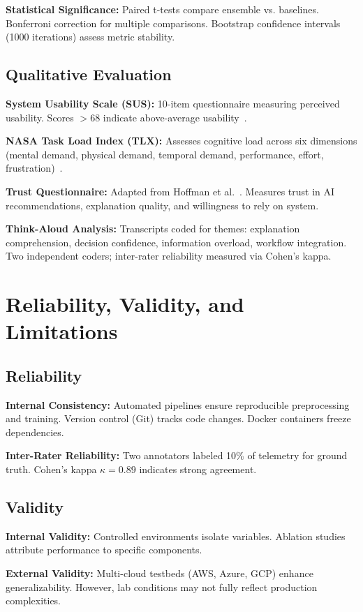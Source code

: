 \textbf{Statistical Significance:} Paired t-tests compare ensemble vs. baselines. Bonferroni correction for multiple comparisons. Bootstrap confidence intervals (1000 iterations) assess metric stability.

\subsection{Qualitative Evaluation}
\textbf{System Usability Scale (SUS):} 10-item questionnaire measuring perceived usability. Scores $>$68 indicate above-average usability~\cite{brooke1996sus}.

\textbf{NASA Task Load Index (TLX):} Assesses cognitive load across six dimensions (mental demand, physical demand, temporal demand, performance, effort, frustration)~\cite{hart1988nasatlx}.

\textbf{Trust Questionnaire:} Adapted from Hoffman et al.~\cite{hoffman2018metrics}. Measures trust in AI recommendations, explanation quality, and willingness to rely on system.

\textbf{Think-Aloud Analysis:} Transcripts coded for themes: explanation comprehension, decision confidence, information overload, workflow integration. Two independent coders; inter-rater reliability measured via Cohen's kappa.

\section{Reliability, Validity, and Limitations}\label{sec:method-reliability}
\subsection{Reliability}
\textbf{Internal Consistency:} Automated pipelines ensure reproducible preprocessing and training. Version control (Git) tracks code changes. Docker containers freeze dependencies.

\textbf{Inter-Rater Reliability:} Two annotators labeled 10\% of telemetry for ground truth. Cohen's kappa $\kappa = 0.89$ indicates strong agreement.

\subsection{Validity}
\textbf{Internal Validity:} Controlled environments isolate variables. Ablation studies attribute performance to specific components.

\textbf{External Validity:} Multi-cloud testbeds (AWS, Azure, GCP) enhance generalizability. However, lab conditions may not fully reflect production complexities.

